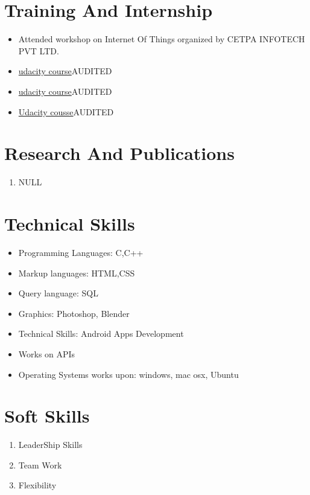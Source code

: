 \documentclass{article}
\begin{document}
\section{Training And Internship}
\begin{itemize}
\item {Attended workshop on Internet Of Things organized by CETPA INFOTECH PVT LTD.}
\item \href{https://classroom.udacity.com/courses/ud836}{udacity course}{AUDITED}
\item \href{https://classroom.udacity.com/courses/ud839}{udacity course}{AUDITED}
\item \href{https://classroom.udacity.com/courses/ud834}{Udacity cousse}{AUDITED}
\end{itemize}
\section{Research And Publications}
\begin{enumerate}
\item {NULL}
\end{enumerate}
\section{Technical Skills}
\begin{itemize}
\item {Programming Languages: C,C++}
\item {Markup languages: HTML,CSS}
\item {Query language: SQL}
\item {Graphics: Photoshop, Blender}
\item {Technical Skills: Android Apps Development}
\item {Works on APIs}
\item {Operating Systems works upon: windows, mac osx, Ubuntu}
\end{itemize}
\section{Soft Skills}
\begin{enumerate}
\item {LeaderShip Skills}
\item {Team Work}
\item {Flexibility}
\end{enumerate}
\end{document}

